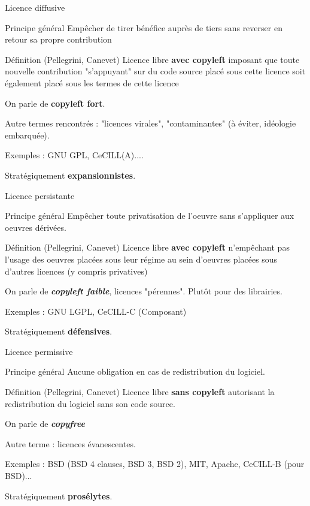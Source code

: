 \documentclass{beamer}
\begin{document}
\begin{frame}{Licence diffusive}

  \begin{block}{Principe général}
    Empêcher de tirer bénéfice auprès de tiers sans reverser en retour
    sa propre contribution
  \end{block}

  \begin{alertblock}{Définition (Pellegrini, Canevet)}
    Licence libre \textbf{avec copyleft} imposant que toute nouvelle
    contribution "s'appuyant" sur du code source placé sous cette
    licence soit également placé sous les termes de cette licence
  \end{alertblock}

  On parle de \textbf{copyleft fort}.

  Autre termes rencontrés : "licences virales", "contaminantes" (à
  éviter, idéologie embarquée).
  
  Exemples : GNU GPL, CeCILL(A)....

  Stratégiquement \textbf{expansionnistes}.
\end{frame}


\begin{frame}{Licence persistante}

\begin{block}{Principe général}
  Empêcher toute privatisation de l'oeuvre sans s'appliquer aux
  oeuvres dérivées.
\end{block}

  \begin{alertblock}{Définition (Pellegrini, Canevet)}
    Licence libre \textbf{avec copyleft} n'empêchant pas l'usage des
    oeuvres placées sous leur régime au sein d'oeuvres placées sous
    d'autres licences (y compris privatives)
  \end{alertblock}

  On parle de \textit{\textbf{copyleft faible}}, licences
  "pérennes". Plutôt pour des librairies.
 
  Exemples : GNU LGPL, CeCILL-C (Composant)

  Stratégiquement \textbf{défensives}.

\end{frame}


\begin{frame}{Licence permissive}
  \begin{block}{Principe général}
    Aucune obligation en cas de redistribution du logiciel.
  \end{block}

  \begin{alertblock}{Définition (Pellegrini, Canevet)}
    Licence libre \textbf{sans copyleft} autorisant la redistribution
    du logiciel sans son code source.
  \end{alertblock}

  On parle de \textit{\textbf{copyfree}}

  Autre terme : licences évanescentes.

  Exemples : BSD (BSD 4 clauses, BSD 3, BSD 2), MIT, Apache, CeCILL-B
  (pour BSD)...

  Stratégiquement \textbf{prosélytes}.
\end{frame}
\end{document}
